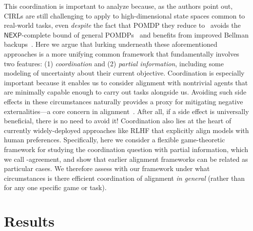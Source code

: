 This coordination is important to analyze because, as the authors point out, CIRLs are still challenging to apply to high-dimensional state spaces common to real-world tasks, even \emph{despite} the fact that POMDP they reduce to~\citep{nayyar2013decentralized} avoids the $\mathsf{NEXP}$-complete bound of general POMDPs~\citep{bernstein2002complexity} and benefits from improved Bellman backups~\citep{palaniappan2017efficient}.
Here we argue that lurking underneath these aforementioned approaches is a more unifying common framework that fundamentally involves two features: (1) \emph{coordination} and (2) \emph{partial information}, including some modeling of uncertainty about their current objective.
Coordination is especially important because it enables us to consider alignment with nontrivial agents that are minimally capable enough to carry out tasks alongside us.
Avoiding such side effects in these circumstances naturally provides a proxy for mitigating negative externalities---a core concern in alignment~\citep{amodei2016concrete}.
After all, if a side effect is universally beneficial, there is no need to avoid it!
Coordination also lies at the heart of currently widely-deployed approaches like RLHF that explicitly align models with human preferences.
Specifically, here we consider a flexible game-theoretic framework for studying the coordination question with partial information, which we call \agree-agreement, and show that earlier alignment frameworks can be related as particular cases.
We therefore assess with our framework under what circumstances is there efficient coordination of alignment \emph{in general} (rather than for any one specific game or task).

\section{Results}
\label{sec:results}
